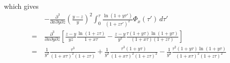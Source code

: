 \documentclass[11pt]{article}
\begin{document}
which gives
\begin{align}
    \quad& -\frac{\partial^3}{\partial x \partial y \partial z} \left(\frac{y-z}{y}\right)^2 \int_0^{\tau} \frac{\ln(1+y\tau')}{(1+z\tau')^2} \Phi_x(\tau') \,d\tau' \\\nonumber
    =&{} \frac{\partial^3}{\partial x \partial y \partial  z} \left[\frac{z-y}{yz}\frac{\ln(1+z\tau)}{1+x\tau} - \frac{z-y}{y^2}\frac{\tau(1+y\tau)\ln(1+y\tau)}{(1+x\tau)(1+z\tau)} \right] \\\nonumber
    =&{} \frac{1}{y^2}\frac{\tau^3}{(1+x\tau)^2(1+z\tau)} + \frac{1}{y^2}\frac{\tau^3(1+y\tau)}{(1+x\tau)^2(1+z\tau)^2}
    - \frac{1}{y^2}\frac{\tau^2(1+y\tau)\ln(1+y\tau)}{(1+x\tau)^2(1+z\tau)^2}
\end{align}
\end{document}
